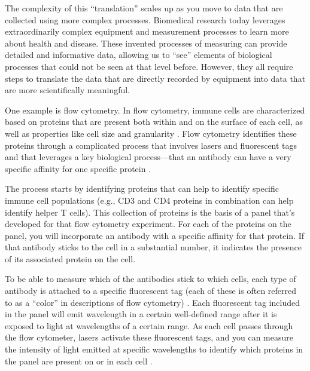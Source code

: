 \documentclass[]{tufte-book}
\begin{document}
The complexity of this ``translation'' scales up as you move to data that are
collected using more complex processes. Biomedical research today leverages
extraordinarily complex equipment and measurement processes to learn more about
health and disease. These invented processes of measuring can
provide detailed and informative data, allowing us to ``see''
elements of biological processes that could not be seen at that level before.
However, they all require steps to translate the data that are directly
recorded by equipment into data that are more scientifically meaningful.

One example is flow cytometry. In flow cytometry, immune cells are characterized
based on proteins that are present both within and on the surface of each cell,
as well as properties like cell size and granularity \citep{maecker2012standardizing, barnett2008cd4}. Flow cytometry identifies these proteins through a complicated
process that involves lasers and fluorescent tags and that leverages a key
biological process---that an antibody can have a very specific affinity for one
specific protein \citep{barnett2008cd4}.

The process starts by identifying proteins that can help to
identify specific immune cell populations (e.g., CD3 and CD4 proteins in
combination can help identify helper T cells). This collection of proteins is
the basis of a panel that's developed for that flow cytometry experiment. For
each of the proteins on the panel, you will incorporate an antibody with a
specific affinity for that protein. If that antibody sticks to the cell in a
substantial number, it indicates the presence of its associated protein on the
cell.

To be able to measure which of the antibodies stick to which cells, each type of
antibody is attached to a specific fluorescent tag (each of these is often
referred to as a ``color'' in descriptions of flow cytometry) \citep{benoist2011flow}.
Each fluorescent tag included in the panel will emit wavelength in a certain
well-defined range after it is exposed to light at wavelengths of a certain
range. As each cell passes through the flow cytometer, lasers activate these
fluorescent tags, and you can measure the intensity of light emitted at specific
wavelengths to identify which proteins in the panel are present on or in each
cell \citep{barnett2008cd4}.
\end{document}
